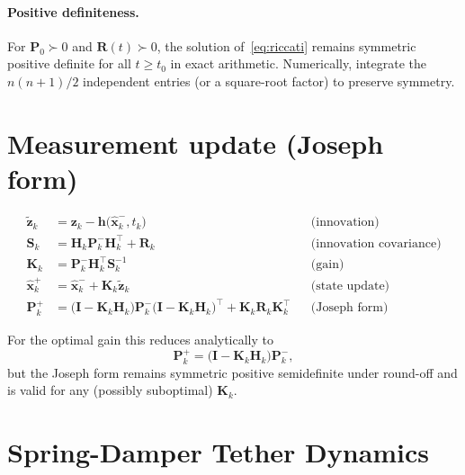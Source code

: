 \documentclass[]{article}
\newcommand{\xh}{\hat{\bm{x}}}
\newcommand{\z}{\bm{z}}
\newcommand{\Pm}{\mathbf{P}}
\newcommand{\Hm}{\mathbf{H}}
\newcommand{\Km}{\mathbf{K}}
\newcommand{\Rm}{\mathbf{R}}
\newcommand{\Sm}{\mathbf{S}}
\newcommand{\Id}{\mathbf{I}}
\begin{document}
\paragraph{Positive definiteness.}
For $\Pm_0\succ 0$ and $\Rm(t)\succ 0$, the solution of~\eqref{eq:riccati}
remains symmetric positive definite for all $t\ge t_0$ in exact arithmetic.
Numerically, integrate the $n(n+1)/2$ independent entries (or a square-root
factor) to preserve symmetry.

\section*{Measurement update (Joseph form)}
\begin{align}
  \tilde{\z}_k &= \z_k - \bm{h}\big(\xh_k^-,t_k\big)
     && \text{(innovation)} \\
  \Sm_k &= \Hm_k\Pm_k^-\Hm_k^\top + \Rm_k
     && \text{(innovation covariance)} \\
  \Km_k &= \Pm_k^-\Hm_k^\top\Sm_k^{-1}
     && \text{(gain)} \\
  \xh_k^+ &= \xh_k^- + \Km_k\tilde{\z}_k
     && \text{(state update)} \\
  \Pm_k^+ &= \big(\Id-\Km_k\Hm_k\big)\Pm_k^-\big(\Id-\Km_k\Hm_k\big)^\top
             + \Km_k\Rm_k\Km_k^\top
     && \text{(Joseph form)}
\end{align}

For the optimal gain this reduces analytically to
\begin{equation}
  \Pm_k^+ = \big(\Id-\Km_k\Hm_k\big)\Pm_k^-,
\end{equation}
but the Joseph form remains symmetric positive semidefinite under round-off
and is valid for any (possibly suboptimal) $\Km_k$.

\appendix
\section{Spring-Damper Tether Dynamics}
\end{document}
